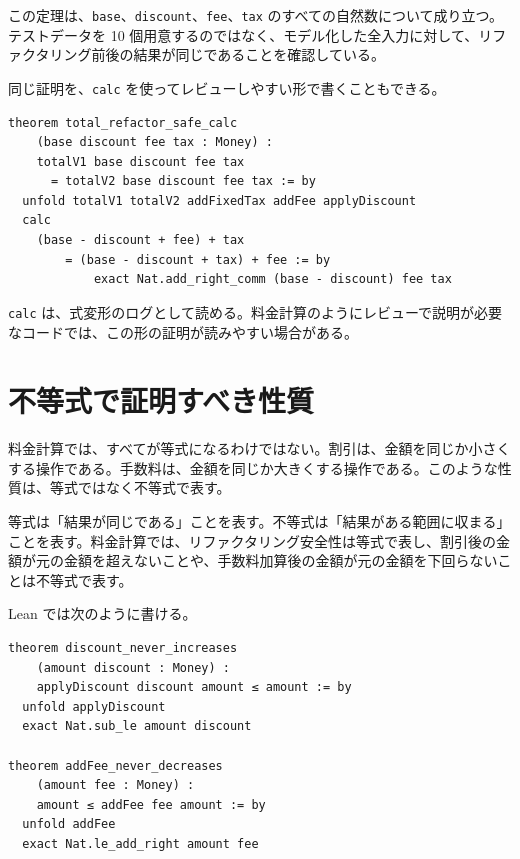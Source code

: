 この定理は、\texttt{base}、\texttt{discount}、\texttt{fee}、\texttt{tax} のすべての自然数について成り立つ。テストデータを 10 個用意するのではなく、モデル化した全入力に対して、リファクタリング前後の結果が同じであることを確認している。

同じ証明を、\texttt{calc} を使ってレビューしやすい形で書くこともできる。

\begin{listing}[htbp]
\begin{verbatim}
theorem total_refactor_safe_calc
    (base discount fee tax : Money) :
    totalV1 base discount fee tax
      = totalV2 base discount fee tax := by
  unfold totalV1 totalV2 addFixedTax addFee applyDiscount
  calc
    (base - discount + fee) + tax
        = (base - discount + tax) + fee := by
            exact Nat.add_right_comm (base - discount) fee tax
\end{verbatim}
\caption{calc によるレビュー可能な等式変形}
\label{lst:ch20-total-refactor-calc}
\end{listing}

\texttt{calc} は、式変形のログとして読める。料金計算のようにレビューで説明が必要なコードでは、この形の証明が読みやすい場合がある。

\section{不等式で証明すべき性質}

料金計算では、すべてが等式になるわけではない。割引は、金額を同じか小さくする操作である。手数料は、金額を同じか大きくする操作である。このような性質は、等式ではなく不等式で表す。

\begin{definitionbox}
等式は「結果が同じである」ことを表す。不等式は「結果がある範囲に収まる」ことを表す。料金計算では、リファクタリング安全性は等式で表し、割引後の金額が元の金額を超えないことや、手数料加算後の金額が元の金額を下回らないことは不等式で表す。
\end{definitionbox}

Lean では次のように書ける。

\begin{listing}[htbp]
\begin{verbatim}
theorem discount_never_increases
    (amount discount : Money) :
    applyDiscount discount amount ≤ amount := by
  unfold applyDiscount
  exact Nat.sub_le amount discount

theorem addFee_never_decreases
    (amount fee : Money) :
    amount ≤ addFee fee amount := by
  unfold addFee
  exact Nat.le_add_right amount fee
\end{verbatim}
\caption{割引と手数料の単調な性質}
\label{lst:ch20-inequalities}
\end{listing}

